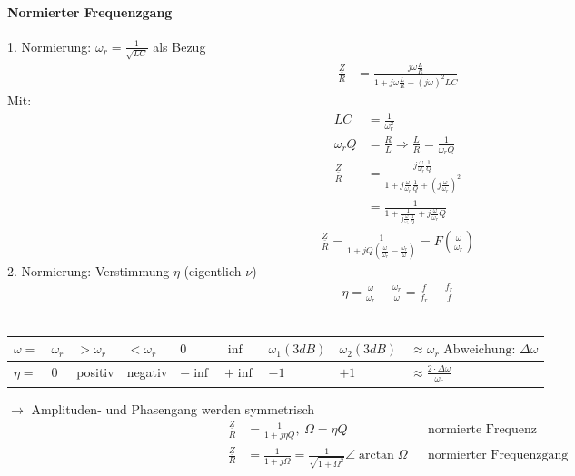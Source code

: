 % 	

\paragraph{Normierter Frequenzgang}
1. Normierung: $\omega_r=\frac{1}{\sqrt{LC}}$ als Bezug
\begin{align}
	\frac{\underline{Z}}{R} &=
	\frac{j\omega\frac{L}{R}}{1+j\omega\frac{L}{R}+(j\omega)^2LC}\nonumber
\end{align}
Mit:
\begin{align}
	LC&=\frac{1}{\omega_r^2}\nonumber\\
	\omega_rQ &= \frac{R}{L} \Rightarrow \frac{L}{R}=\frac{1}{\omega_rQ}\nonumber\\
	\frac{\underline{Z}}{R} &=
	\frac{j\frac{\omega}{\omega_r}\frac{1}{Q}}{1+j\frac{\omega}{\omega_r}\frac{1}{Q}+\left(j\frac{\omega}{\omega_r}\right)^2}\nonumber\\
	&=\frac{1}{1+\frac{1}{j\frac{\omega}{\omega_r}\frac{1}{Q}}+j\frac{\omega}{\omega_r}Q}\nonumber
	\end{align}
	\begin{align}
	\boxed{\frac{\underline{Z}}{R} =
	\frac{1}{1+jQ\left(\frac{\omega}{\omega_r}-\frac{\omega_r}{\omega}\right)} =
	F\left(\frac{\omega}{\omega_r}\right)}
\end{align}
2. Normierung: Verstimmung $\eta$ (eigentlich $\nu$)
\begin{align}
	\boxed{\eta=\frac{\omega}{\omega_r}-\frac{\omega_r}{\omega}} = \frac{f}{f_r} -
	\frac{f_r}{f}
\end{align}\\
\begin{tabular}{l|l|l|l|l|l|l|l|l|}
	$\omega =$ &
	$\omega_r$ &
	$>\omega_r$ &
	$<\omega_r$ &
	$0$ &
	$\inf$ &
	$\omega_1(3dB)$ &
	$\omega_2(3dB)$ &
	$\approx\omega_r \text{ Abweichung: } \Delta\omega$	
	\\
	\hline
	$\eta =$ &
	$0$ &
	positiv &
	negativ &
	$-\inf$ &
	$+\inf$ &
	$-1$ &
	$+1$ &
	$\approx\frac{2\cdot\Delta\omega}{\omega_r}$\\	
\end{tabular}

$\rightarrow$ Amplituden- und Phasengang werden symmetrisch
\begin{align}
 	\frac{\underline{Z}}{R} &= \frac{1}{1+j\eta Q},\ \Omega=\eta Q
 	&&\text{normierte Frequenz}\nonumber\\
 	\frac{\underline{Z}}{R} &= \frac{1}{1+j\Omega} =
 	\frac{1}{\sqrt{1+\Omega^2}}\angle
 	\arctan{\Omega} &&\text{normierter
 	Frequenzgang}\nonumber
\end{align}

